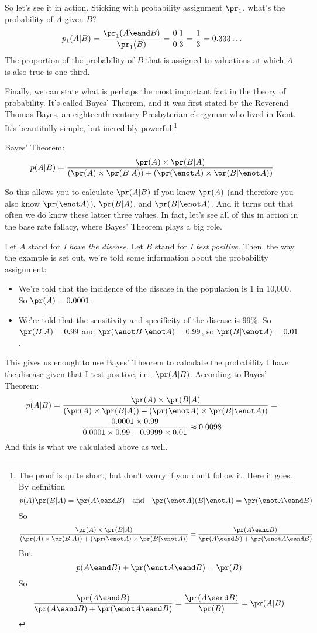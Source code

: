 So let's see it in action. Sticking with probability assignment $\pr_1$, what's the probability of $A$ given $B$?
\[
p_1(A | B) = \frac{\pr_1(A\eand B)}{\pr_1(B)} = \frac{0.1}{0.3} = \frac{1}{3} = 0.333\ldots
\]
The proportion of the probability of $B$ that is assigned to valuations at which $A$ is also true is one-third.

Finally, we can state what is perhaps the most important fact in the theory of probability. It's called Bayes' Theorem, and it was first stated by the Reverend Thomas Bayes, an eighteenth century Presbyterian clergyman who lived in Kent. It's beautifully simple, but incredibly powerful:\footnote{The proof is quite short, but don't worry if you don't follow it. Here it goes. By definition
\[
p(A) \pr(B|A) = \pr(A\eand B) \mbox{\ \ \ and\ \ \ } \pr(\enot A)(B | \enot A) = \pr(\enot A\eand B)
\]
So
\[
\frac{\pr(A) \times \pr(B|A)}{(\pr(A) \times \pr(B|A)) + (\pr(\enot A)\times \pr(B|\enot A))} = \frac{\pr(A\eand B)}{\pr(A\eand B) + \pr(\enot A\eand B)}
\]
But
\[
p(A\eand B) + \pr(\enot A\eand B) = \pr(B)
\]
So
\[
\frac{\pr(A\eand B)}{\pr(A\eand B) + \pr(\enot A\eand B)} = \frac{\pr(A\eand B)}{\pr(B)} = \pr(A|B)
\]
}
\begin{highlighted}
Bayes' Theorem:
\[
p(A | B) = \frac{\pr(A) \times \pr(B|A)}{(\pr(A) \times \pr(B|A)) + (\pr(\enot A)\times \pr(B|\enot A))}
\]
\end{highlighted}
So this allows you to calculate $\pr(A|B)$ if you know $\pr(A)$ (and therefore you also know $\pr(\enot A)$), $\pr(B|A)$, and $\pr(B | \enot A)$. And it turns out that often we do know these latter three values. In fact, let's see all of this in action in the base rate fallacy, where Bayes' Theorem plays a big role.

Let $A$ stand for \emph{I have the disease}. Let $B$ stand for \emph{I test positive}. Then, the way the example is set out, we're told some information about the probability assignment:
\begin{itemize}
\item We're told that the incidence of the disease in the population is 1 in 10,000. So $\pr(A) = 0.0001$.
\item We're told that the sensitivity and specificity of the disease is 99\%. So $\pr(B | A) = 0.99$ and $\pr(\enot B | \enot A) = 0.99$, so $\pr(B | \enot A) = 0.01$.
\end{itemize}
This gives us enough to use Bayes' Theorem to calculate the probability I have the disease given that I test positive, i.e., $\pr(A | B)$. According to Bayes' Theorem:
\begin{multline*}
p(A | B) = \frac{\pr(A) \times \pr(B|A)}{(\pr(A) \times \pr(B|A)) + (\pr(\enot A)\times \pr(B|\enot A))} = \\ \frac{0.0001 \times 0.99}{0.0001 \times 0.99 + 0.9999 \times 0.01} \approx 0.0098
\end{multline*}
And this is what we calculated above as well.

